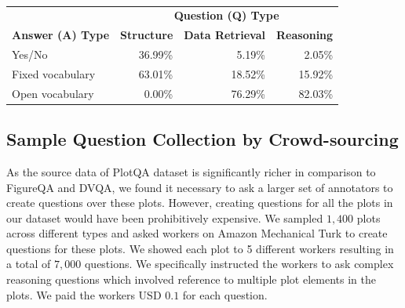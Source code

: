 \documentclass[10pt,twocolumn,letterpaper]{article}
\begin{document}
\begin{table}[]
\footnotesize
\begin{center}
\begin{tabular}{|l|r|r|r|}
\hline
&\multicolumn{3}{|c|}{\textbf{Question (Q) Type}} \\ \cline{2-4}
\multicolumn{1}{|c|}{\textbf{Answer (A) Type}} & \multicolumn{1}{c|}{\textbf{Structure}} & \multicolumn{1}{c|}{\textbf{Data Retrieval}} & \multicolumn{1}{c|}{\textbf{Reasoning}} \\ \hline
Yes/No & 36.99\% & 5.19\% & 2.05\% \\
Fixed  vocabulary & 63.01\% & 18.52\% & 15.92\% \\
Open vocabulary & 0.00\% & 76.29\% & 82.03\% \\ \hline
\end{tabular}
\caption{}
\label{template_ans_stats}
\end{center}
\end{table}

\subsection{Sample Question Collection by Crowd-sourcing}
As the source data of PlotQA dataset is significantly richer in comparison to FigureQA and DVQA, we found it necessary to ask a larger set of annotators to create questions over these plots. 
However, creating questions for all the plots in our dataset would have been prohibitively expensive. 
We sampled $1,400$ plots across different types and asked workers on Amazon Mechanical Turk to create questions for these plots. 
We showed each plot to 5 different workers resulting in a total of $7,000$ questions. 
We specifically instructed the workers to ask complex reasoning questions which involved reference to multiple plot elements in the plots. 
We paid the workers USD $0.1$ for each question.
\end{document}
